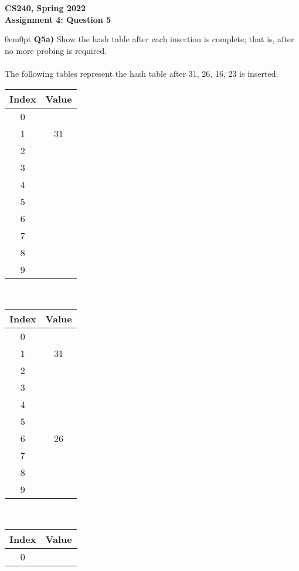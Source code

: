 \documentclass[12pt]{article}
\begin{document}
\begin{center}
{\Large\textbf{CS240, Spring 2022}}\\
\vspace{2mm}
{\Large\textbf{Assignment 4: Question 5}}\\
\vspace{3mm}
\end{center}
\begin{adjustwidth}{0em}{0pt}
\textbf{Q5a)} Show the hash table after each insertion is complete; that is, after no more probing is required. \\\\
The following tables represent the hash table after 31, 26, 16, 23 is inserted:
\begin{center}
\begin{tabular}{||c | c||}
	\hline
    Index & Value\\
    \hline\hline
    0 &\\
    \hline
    1 & 31\\
    \hline
    2 &\\
    \hline
    3 &\\
    \hline
    4 &\\
    \hline
    5 &\\
    \hline
    6 &\\
    \hline
    7 &\\
    \hline
    8 &\\
    \hline
    9 &\\
    \hline
\end{tabular} \ 
\begin{tabular}{||c | c||}
	\hline
    Index & Value\\
    \hline\hline
    0 &\\
    \hline
    1 & 31\\
    \hline
    2 &\\
    \hline
    3 &\\
    \hline
    4 &\\
    \hline
    5 &\\
    \hline
    6 & 26\\
    \hline
    7 &\\
    \hline
    8 &\\
    \hline
    9 &\\
    \hline
\end{tabular} \
\begin{tabular}{||c | c||}
	\hline
    Index & Value\\
    \hline\hline
    0 &\\

\end{tabular}
\end{center}
\end{adjustwidth}
\end{document}

